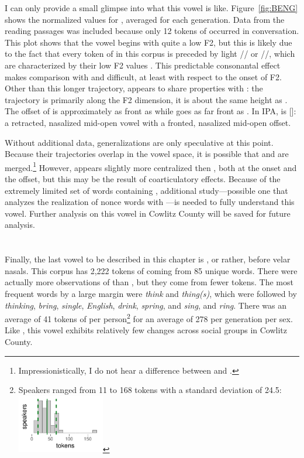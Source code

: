 I can only provide a small glimpse into what this vowel is like. Figure~\ref{fig:BENG} shows the normalized values for \beng, averaged for each generation. Data from the reading passages was included because only 12 tokens of \beng occurred in conversation. This plot shows that the
\beng vowel begins with quite a low F2, but this is likely due to the fact that every token of \beng in this corpus is preceded by light // or //, which are characterized by their low F2 values \citep{olive_etal_1993}. This predictable consonantal effect makes comparison with \bang and \bing difficult, at least with respect to the onset of F2. Other than this longer trajectory, \beng appears to share properties with \bang: the trajectory is primarily along the F2 dimension, it is about the same height as \bet. The offset of \beng is approximately as front as \bit while \bang goes as far front as \fleece. In IPA, \beng is []: a retracted, nasalized mid-open vowel with a fronted, nasalized mid-open offset.

Without additional data, generalizations are only speculative at this point. Because their trajectories overlap in the vowel space, it is possible that \beng and \bang are merged.\footnote{Impressionistically, I do not hear a difference between \bang and \beng.} However, \beng appears slightly more centralized then \bang, both at the onset and the offset, but this may be the result of coarticulatory effects. Because of the extremely limited set of words containing \beng, additional study---possible one that analyzes the realization of nonce words with \beng---is needed to fully understand this vowel. Further analysis on this vowel in Cowlitz County will be saved for future analysis.






\section{\bing}
\label{BING}

Finally, the last vowel to be described in this chapter is \bing, or rather, \kit before velar nasals. This corpus has 2,222 tokens of \bing coming from 85 unique words. There were actually more observations of \bing than \bin, but they come from fewer tokens. The most frequent words by a large margin were \textit{think} and \textit{thing(s)}, which were followed by \textit{thinking}, \textit{bring}, \textit{single}, \textit{English}, \textit{drink}, \textit{spring}, and \textit{sing}, and \textit{ring}. There was an average of 41 tokens of \bing per person\footnote{Speakers ranged from 11 to 168 tokens with a standard deviation of 24.5: \includegraphics[width = 1.5in]{Figures/BING/BING_tiny.pdf}} for an average of 278 per generation per sex. Like \bin, this vowel exhibits relatively few changes across social groups in Cowlitz County.


